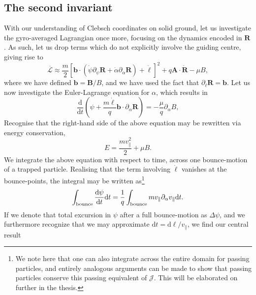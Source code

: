 \subsection*{The second invariant}
With our understanding of Clebsch coordinates on solid ground, let us investigate the gyro-averaged Lagrangian once more, focusing on the dynamics encoded in $\boldsymbol{R}$. As such, let us drop terms which do not explicitly involve the guiding centre, giving rise to
\begin{equation}
    \overline{\mathcal{L}} \approx \frac{m}{2}\left[\boldsymbol{b} \cdot \left( \dot{\psi}\partial_\psi \boldsymbol{R}  + \dot{\alpha} \partial_\alpha \boldsymbol{R} \right) + \dot{\ell}  \right]^2 + q \boldsymbol{A} \cdot \dot{\boldsymbol{R}} - \mu B,
\end{equation}
where we have defined $\boldsymbol{b} = \boldsymbol{B}/B$, and we have used the fact that $\partial_\ell \boldsymbol{R}= \boldsymbol{b}$. Let us now investigate the Euler-Lagrange equation for $\alpha$, which results in
\begin{equation}
    \frac{\mathrm{d}}{\mathrm{d}t}\left( \psi + \frac{m \dot{\ell}}{q} \boldsymbol{b} \cdot \partial_\alpha \boldsymbol{R} \right) = - \frac{\mu}{q} \partial_\alpha B,
    \label{eq: euler-lagrange for psi}
\end{equation}
Recognise that the right-hand side of the above equation may be rewritten via energy conservation,
\begin{equation}
    E = \frac{m v_\parallel^2}{2} + \mu B.
\end{equation}
We integrate the above equation with respect to time, across one bounce-motion of a trapped particle. Realising that the term involving $\dot{\ell}$ vanishes at the bounce-points, the integral may be written as\footnote{We note here that one can also integrate across the entire domain for passing particles, and entirely analogous arguments can be made to show that passing particles conserve this passing equivalent of $\mathcal{J}$. This will be elaborated on further in the thesis.}
\begin{equation}
    \int_{\rm bounce} \frac{\mathrm{d}\psi}{\mathrm{d}t} \mathrm{d}t = \frac{1}{q} \int_{\rm bounce} m v_\parallel  \partial_\alpha v_\parallel \mathrm{d}t.
    \label{eq: euler-lagrange for psi}
\end{equation}
If we denote that total excursion in $\psi$ after a full bounce-motion as $\Delta \psi$, and we furthermore recognize that we may approximate $\mathrm{d}t = \mathrm{d} \ell/v_\parallel$, we find our central result
